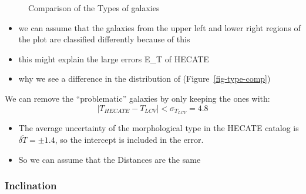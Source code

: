 \documentclass[
]{article}
\providecommand{\tightlist}{%
  \setlength{\itemsep}{0pt}\setlength{\parskip}{0pt}}\usepackage{longtable,booktabs,array}
\begin{document}
\begin{figure}
\begin{minipage}{0.50\linewidth}
{}


\end{minipage}%

\caption{\label{fig-types-compare}Comparison of the Types of galaxies}

\end{figure}%

\begin{itemize}
\tightlist
\item
  we can assume that the galaxies from the upper left and lower right
  regions of the plot are classified differently because of this
\item
  this might explain the large errors E\_T of HECATE
\item
  why we see a difference in the distribution of
  (Figure~\ref{fig-type-comp})
\end{itemize}

We can remove the ``problematic'' galaxies by only keeping the ones
with: \[
|{T_{HECATE}-T_{LCV}}|<\sigma_{T_{LCV}} = 4.8
\]

\begin{itemize}
\tightlist
\item
  The average uncertainty of the morphological type in the HECATE
  catalog is \(\overline{\delta T} = \pm 1.4\), so the intercept is
  included in the error.
\item
  So we can assume that the Distances are the same
\end{itemize}

\subsubsection{Inclination}
\end{document}
